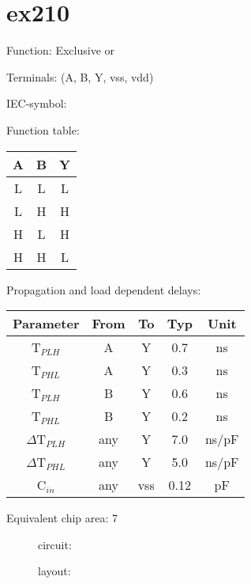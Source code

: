 \section{ex210}

Function: Exclusive or

Terminals: (A, B, Y, vss, vdd)


IEC-symbol:
\begin{figure}[bth]
\end{figure}

Function table:
\begin{table}[bth]
\begin{tabular}{|c|c||c|}
\hline
A	&B	&Y\\
\hline
L	&L	&L\\
L	&H	&H\\
H	&L	&H\\
H	&H	&L\\
\hline
\end{tabular}
\vspace{1cm}



Propagation and load dependent delays:\\

\begin{tabular}{|c|c|c|c|c|}
\hline
Parameter               &From            &To   &Typ    &Unit\\
\hline
T$_{PLH}$               &A     		&Y      &0.7    &ns\\
T$_{PHL}$               &A    		&Y      &0.3    &ns\\
T$_{PLH}$               &B     		&Y      &0.6    &ns\\
T$_{PHL}$               &B    		&Y      &0.2    &ns\\
\hline
$\Delta$T$_{PLH}$       &any          	&Y      &7.0    &ns/pF\\
$\Delta$T$_{PHL}$       &any           	&Y      &5.0    &ns/pF\\
\hline
C$_{in}$                &any	    	&vss    &0.12   &pF\\
\hline
\end{tabular}
\end{table}

Equivalent chip area: 7

\begin{figure}[bth]
circuit:\\

\end{figure}




\begin{figure}[bth]
layout:\\

\end{figure}


\clearpage
